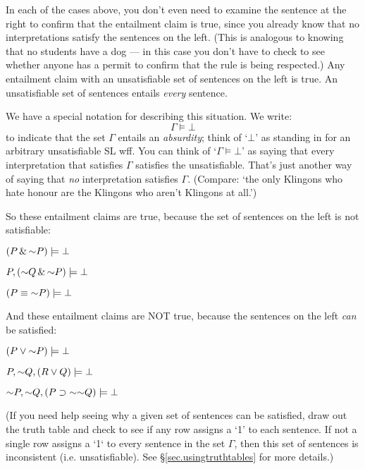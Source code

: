 {{In each of the cases above, you don't even need to examine the sentence at the right to confirm that the entailment claim is true, since you already know that no interpretations satisfy the sentences on the left. (This is analogous to knowing that no students have a dog --- in this case you don't have to check to see whether anyone has a permit to confirm that the rule is being respected.) Any entailment claim with an unsatisfiable set of sentences on the left is true. An unsatisfiable set of sentences entails \emph{every} sentence.

We have a special notation for describing this situation. We write: $$\Gamma \models \bot$$ to indicate that the set $\Gamma$ entails an \emph{absurdity}; think of `$\bot$' as standing in for an arbitrary unsatisfiable SL wff. You can think of `$\Gamma \models \bot$' as saying that every interpretation that satisfies $\Gamma$ satisfies the unsatisfiable. That's just another way of saying that \emph{no} interpretation satisfies $\Gamma$. (Compare: `the only Klingons who hate honour are the Klingons who aren't Klingons at all.')


So these entailment claims are true, because the set of sentences on the left is not satisfiable:

\begin{earg}
\item[] $(P \eand \enot P) \models \bot$
\item[] $P, (\enot Q \eand \enot P) \models\bot$
\item[] $(P \eiff\enot P) \models\bot$
\end{earg}

And these entailment claims are NOT true, because the sentences on the left \emph{can} be satisfied:

\begin{earg}
\item[] $(P \eor \enot P) \models\bot$
\item[] $P, \enot Q, (R \eor Q) \models\bot$
\item[] $\enot P, \enot Q, (P \eif \enot\enot Q) \models\bot$
\end{earg}

(If you need help seeing why a given set of sentences can be satisfied, draw out the truth table and check to see if any row assigns a `1' to each sentence. If not a single row assigns a `1` to every sentence in the set $\Gamma$, then this set of sentences is inconsistent (i.e. unsatisfiable). See \S\ref{sec.usingtruthtables} for more details.)




}}
